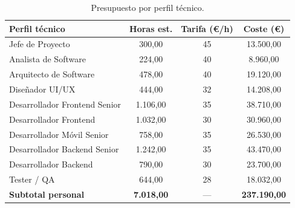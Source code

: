 \begin{table}[H]
    \centering
    \renewcommand{\arraystretch}{1.2}
    \begin{tabular}{lccc}
        \toprule
        \textbf{Perfil técnico}    & \textbf{Horas est.} & \textbf{Tarifa (€/h)} & \textbf{Coste (€)}  \\
        \midrule
        Jefe de Proyecto           & 300,00              & 45                    & 13.500,00           \\ Analista de Software          & 224,00              & 40                    & 8.960,00            \\ Arquitecto de Software        & 478,00              & 40                    & 19.120,00           \\ Diseñador UI/UX               & 444,00              & 32                    & 14.208,00           \\ Desarrollador Frontend Senior & 1.106,00            & 35                    & 38.710,00           \\ Desarrollador Frontend        & 1.032,00            & 30                    & 30.960,00           \\ Desarrollador Móvil Senior    & 758,00              & 35                    & 26.530,00           \\ Desarrollador Backend Senior  & 1.242,00            & 35                    & 43.470,00           \\ Desarrollador Backend         & 790,00              & 30                    & 23.700,00           \\ Tester / QA                   & 644,00              & 28                    & 18.032,00           \\
        \midrule
        \textbf{Subtotal personal} & \textbf{7.018,00}   & ---                   & \textbf{237.190,00} \\
        \bottomrule
    \end{tabular}
    \caption{Presupuesto por perfil técnico.}
    \label{tab:presupuesto_equipo}
\end{table}

